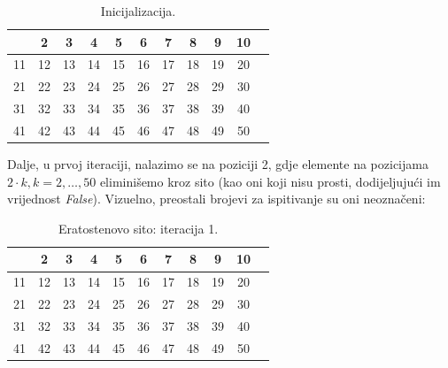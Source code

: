 \begin{table}[H]
	\centering
	\begin{tabular}{|c|c|c|c|c|c|c|c|c|c|c} \hline
       & 2 & 3 & 4 & 5 & 6 & 7 & 8 & 9 & 10 \\ \hline
    11 & 12 & 13 & 14 & 15 & 16 & 17 & 18 & 19 & 20 \\ \hline
    21 & 22 & 23 & 24 & 25 & 26 & 27 & 28 & 29 & 30 \\ \hline
    31 & 32 & 33 & 34 & 35 & 36 & 37 & 38 & 39 & 40 \\ \hline
    41 & 42 & 43 & 44 & 45 & 46 & 47 & 48 & 49 & 50 \\ \hline     
	\end{tabular}
    \caption{Inicijalizacija.} \label{eratosten-sieve-it-0}
\end{table}


Dalje, u prvoj iteraciji, nalazimo se na poziciji 2, gdje elemente na pozicijama $2 \cdot k, k=2, \ldots, 50$ eliminišemo kroz sito (kao oni koji nisu prosti, dodijeljujući im vrijednost \emph{False}). Vizuelno, preostali brojevi za ispitivanje su oni neoznačeni:



\begin{table}[H]
	\centering
	\begin{tabular}{|c|c|c|c|c|c|c|c|c|c|c} \hline
		& 2 & 3 & \cellcolor{red!30}  4 & 5 & \cellcolor{red!30} 6 & 7 & \cellcolor{red!30} 8 & 9 & \cellcolor{red!30} 10 \\ \hline
		11 &\cellcolor{red!30}  12 & 13 & \cellcolor{red!30} 14 & 15 & \cellcolor{red!30} 16 & 17 & \cellcolor{red!30} \cellcolor{red!30} 18 & 19 & \cellcolor{red!30} \cellcolor{red!30} 20 \\ \hline
		21 & \cellcolor{red!30} 22 & 23 & \cellcolor{red!30} 24 & 25 & \cellcolor{red!30} 26 & 27 &\cellcolor{red!30}  28 & 29 & \cellcolor{red!30} \cellcolor{red!30} 30 \\ \hline
		31 & \cellcolor{red!30} 32 & 33 & \cellcolor{red!30} 34 & 35 & \cellcolor{red!30} 36 & 37 & \cellcolor{red!30} 38 & 39 & \cellcolor{red!30} 40 \\ \hline
		41 & \cellcolor{red!30} 42 & 43 & \cellcolor{red!30} 44 & 45 & \cellcolor{red!30} 46 & 47 &\cellcolor{red!30}  48 & 49 &\cellcolor{red!30}  50 \\ \hline     
	\end{tabular}
        \caption{Eratostenovo sito: iteracija 1.} \label{eratosten-sieve-it-1}
\end{table}




